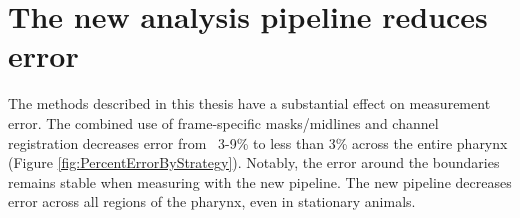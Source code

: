 


\section{The new analysis pipeline reduces error}

The methods described in this thesis have a substantial effect on measurement error. The combined use of frame-specific masks/midlines and channel registration decreases error from ~3-9\% to less than 3\% across the entire pharynx (Figure \ref{fig:PercentErrorByStrategy}). Notably, the error around the boundaries remains stable when measuring with the new pipeline. The new pipeline decreases error across all regions of the pharynx, even in stationary animals.

